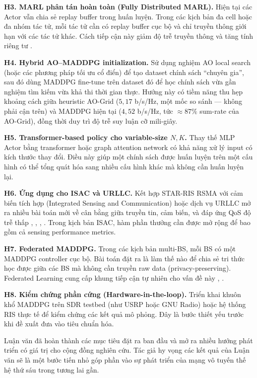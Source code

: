 \textbf{H3. MARL phân tán hoàn toàn (Fully Distributed MARL).} Hiện
tại các Actor vẫn chia sẻ replay buffer trong huấn luyện. Trong các
kịch bản đa cell hoặc đa nhóm tác tử, mỗi tác tử cần có replay buffer
cục bộ và chỉ truyền thông giới hạn với các tác tử khác. Cách tiếp cận
này giảm độ trễ truyền thông và tăng tính riêng tư \cite{mirza2024multi}.

\textbf{H4. Hybrid AO--MADDPG initialization.} Sử dụng nghiệm AO local
search (hoặc các phương pháp tối ưu cổ điển) để tạo dataset chính sách
``chuyên gia'', sau đó dùng MADDPG fine-tune trên dataset đó để học
chính sách vừa gần nghiệm tìm kiếm vừa khả thi thời gian thực. Hướng
này có tiềm năng thu hẹp khoảng cách giữa heuristic AO-Grid ($5{,}17$
b/s/Hz, một mốc so sánh --- không phải cận trên) và MADDPG hiện tại
($4{,}52$ b/s/Hz, tức $\approx 87\%$ sum-rate của AO-Grid), đồng thời
duy trì độ trễ suy luận cỡ mili-giây.

\textbf{H5. Transformer-based policy cho variable-size $N, K$.} Thay
thế MLP Actor bằng transformer hoặc graph attention network có khả
năng xử lý input có kích thước thay đổi. Điều này giúp một chính sách
được huấn luyện trên một cấu hình có thể tổng quát hóa sang nhiều cấu
hình khác mà không cần huấn luyện lại.

\textbf{H6. Ứng dụng cho ISAC và URLLC.} Kết hợp STAR-RIS RSMA với
cảm biến tích hợp (Integrated Sensing and Communication) hoặc dịch vụ
URLLC mở ra nhiều bài toán mới về cân bằng giữa truyền tin, cảm biến,
và đáp ứng QoS độ trễ thấp \cite{soleymani2024starris},
\cite{adams2024rsma}, \cite{jin2024arisrsma}, \cite{jang2024rsma}.
Trong kịch bản ISAC, hàm phần thưởng cần được mở rộng để bao gồm cả
sensing performance metrics.

\textbf{H7. Federated MADDPG.} Trong các kịch bản multi-BS, mỗi BS có
một MADDPG controller cục bộ. Bài toán đặt ra là làm thế nào để chia
sẻ tri thức học được giữa các BS mà không cần truyền raw data
(privacy-preserving). Federated Learning cung cấp khung tiếp cận tự
nhiên cho vấn đề này \cite{noor2025aimulti}, \cite{mousavi2025fed}.

\textbf{H8. Kiểm chứng phần cứng (Hardware-in-the-loop).} Triển khai
khuôn khổ MADDPG trên SDR testbed (như USRP hoặc GNU Radio) hoặc hệ
thống RIS thực tế để kiểm chứng các kết quả mô phỏng. Đây là bước
thiết yếu trước khi đề xuất đưa vào tiêu chuẩn hóa.

\noindent\hrulefill

\vspace{0.5cm}
Luận văn đã hoàn thành các mục tiêu đặt ra ban đầu và mở ra nhiều hướng
phát triển có giá trị cho cộng đồng nghiên cứu. Tác giả hy vọng các kết
quả của Luận văn sẽ là một bước tiến nhỏ góp phần vào sự phát triển của
mạng vô tuyến thế hệ thứ sáu trong tương lai gần.
